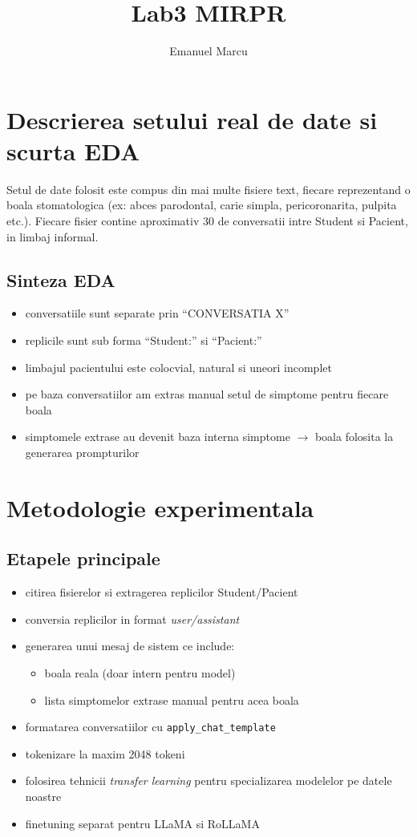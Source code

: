 \documentclass{article}
\title{Lab3 MIRPR}
\author{Emanuel Marcu}
\begin{document}
\maketitle

\section{Descrierea setului real de date si scurta EDA}

Setul de date folosit este compus din mai multe fisiere text, fiecare reprezentand o boala stomatologica (ex: abces parodontal, carie simpla, pericoronarita, pulpita etc.). 
Fiecare fisier contine aproximativ 30 de conversatii intre Student si Pacient, in limbaj informal.

\subsection*{Sinteza EDA}
\begin{itemize}
    \item conversatiile sunt separate prin ``CONVERSATIA X''
    \item replicile sunt sub forma ``Student:'' si ``Pacient:''
    \item limbajul pacientului este colocvial, natural si uneori incomplet
    \item pe baza conversatiilor am extras manual setul de simptome pentru fiecare boala
    \item simptomele extrase au devenit baza interna simptome $\rightarrow$ boala folosita la generarea prompturilor
\end{itemize}


\section{Metodologie experimentala}

\subsection*{Etapele principale}
\begin{itemize}
    \item citirea fisierelor si extragerea replicilor Student/Pacient
    \item conversia replicilor in format \textit{user/assistant}
    \item generarea unui mesaj de sistem ce include:
    \begin{itemize}
        \item boala reala (doar intern pentru model)
        \item lista simptomelor extrase manual pentru acea boala
    \end{itemize}
    \item formatarea conversatiilor cu \texttt{apply\_chat\_template}
    \item tokenizare la maxim 2048 tokeni
    \item folosirea tehnicii \textit{transfer learning} pentru specializarea modelelor pe datele noastre
    \item finetuning separat pentru LLaMA si RoLLaMA
\end{itemize}
\end{document}
